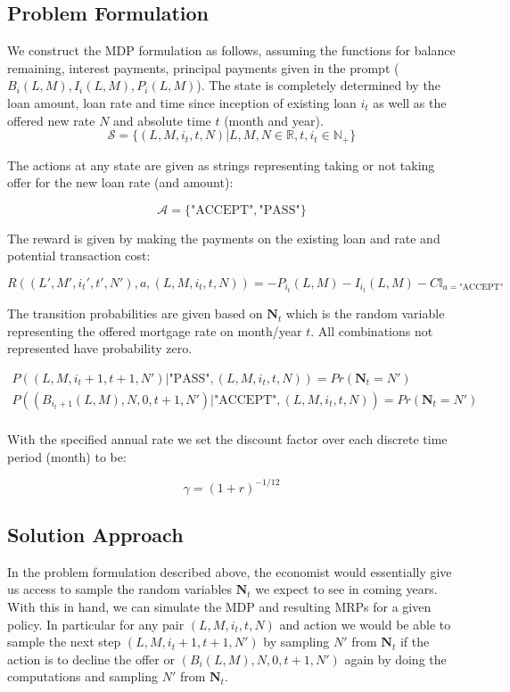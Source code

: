 \documentclass{article}[12pt]
\begin{document}
\subsection{Problem Formulation}
We construct the MDP formulation as follows, assuming the functions for balance remaining, interest payments, principal payments given in the prompt ($B_i(L,M), I_i(L,M), P_i(L,M)$). The state is completely determined by the loan amount, loan rate and time since inception of existing loan $i_t$ as well as the offered new rate $N$ and absolute time $t$ (month and year).
$$ \mathcal{S} = \{(L,M, i_t, t, N) | L, M, N \in \mathbb{R}, t,i_t \in \mathbb{N_+}\}$$ 

The actions at any state are given as strings representing taking or not taking offer for the new loan rate (and amount):

$$\mathcal{A} = \{\text{"ACCEPT"}, \text{"PASS"}\}$$
 
The reward is given by making the payments on the existing loan and rate and potential transaction cost:

$$ R( (L',M', i_t', t', N'), a,  (L,M, i_t, t, N)) = -P_{i_t}(L,M) - I_{i_t}(L,M)-C\mathbb{I}_{a = \text{"ACCEPT"}}$$

The transition probabilities are given based on $\mathbf{N}_{t}$ which is the random variable representing the offered mortgage rate on month/year $t$. All combinations not represented have probability zero.

\begin{align*}
P((L,M, i_t+1, t+1, N')| \text{"PASS"}, (L,M,i_t,t, N)) = Pr(\mathbf{N}_t = N')\\
P((B_{i_t+1}(L,M),N, 0,t+1, N')| \text{"ACCEPT"}, (L,M,i_t, t, N)) = Pr(\mathbf{N}_{t} = N')\\
\end{align*}

With the specified annual rate we set the discount factor over each discrete time period (month) to be:

$$ \gamma = (1+r)^{-1/12}$$
\subsection{Solution Approach}
In the problem formulation described above, the economist would essentially give us access to sample the random variables $\mathbf{N}_t$ we expect to see in coming years. With this in hand, we can simulate the MDP and resulting MRPs for a given policy. In particular for any pair $(L,M,i_t,t,N)$ and action we would be able to sample the next step $(L,M,i_t+1, t+1,N')$ by sampling $N'$ from $\mathbf{N}_t$ if the action is to decline the offer or $(B_i(L,M),N, 0,t+1, N')$ again by doing the computations and sampling $N'$ from $\mathbf{N}_t$.
\end{document}
